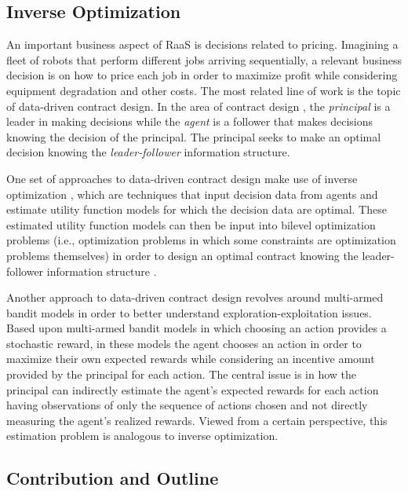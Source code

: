 \documentclass[letterpaper, 10 pt, conference]{IEEEconf}
\begin{document}
\subsection{Inverse Optimization}

An important business aspect of RaaS is decisions related to pricing. Imagining a fleet of robots that perform different jobs arriving sequentially, a relevant business decision is on how to price each job in order to maximize profit while considering equipment degradation and other costs. The most related line of work is the topic of data-driven contract design. In the area of contract design \cite{laffont2002theory}, the \emph{principal} is a leader in making decisions while the \emph{agent} is a follower that makes decisions knowing the decision of the principal. The principal seeks to make an optimal decision knowing the \emph{leader-follower} information structure. 


One set of approaches to data-driven contract design make use of inverse optimization \cite{aswani2018inverse,chan2025inverse}, which are techniques that input decision data from agents and estimate utility function models for which the decision data are optimal. These estimated utility function models can then be input into bilevel optimization problems (i.e., optimization problems in which some constraints are optimization problems themselves) in order to design an optimal contract knowing the leader-follower information structure \cite{aswani2019data,mintz2023behavioral,li2025adaptive}.

Another approach to data-driven contract design revolves around multi-armed bandit models \cite{dogan2023estimating,dogan2023repeated,scheid2024incentivized} in order to better understand exploration-exploitation issues. Based upon multi-armed bandit models in which choosing an action provides a stochastic reward, in these models the agent chooses an action in order to maximize their own expected rewards while considering an incentive amount provided by the principal for each action. The central issue is in how the principal can indirectly estimate the agent's expected rewards for each action having observations of only the sequence of actions chosen and not directly measuring the agent's realized rewards. Viewed from a certain perspective, this estimation problem is analogous to inverse optimization. 

\subsection{Contribution and Outline}
\end{document}
